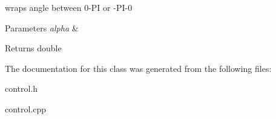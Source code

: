 wraps angle between 0-\/\+PI or -\/\+P\+I-\/0 


\begin{DoxyParams}{Parameters}
{\em alpha} & \\
\hline
\end{DoxyParams}
\begin{DoxyReturn}{Returns}
double 
\end{DoxyReturn}


The documentation for this class was generated from the following files\+:\begin{DoxyCompactItemize}
\item 
control.\+h\item 
control.\+cpp\end{DoxyCompactItemize}
